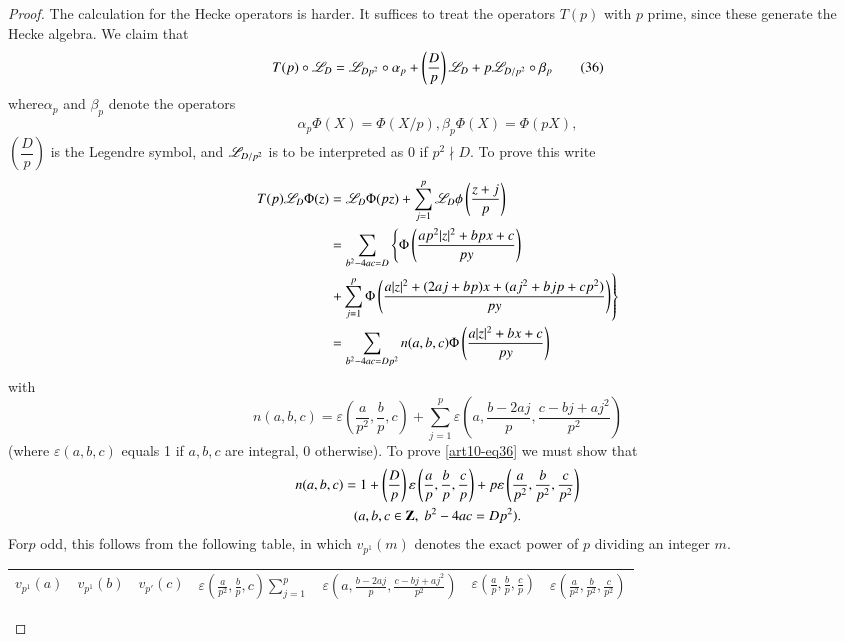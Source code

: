 \begin{proof}
The calculation for the Hecke operators is harder. It suffices to treat the operators $T(p)$ with $p$ prime, since these generate the Hecke algebra. We claim that 
\begin{equation*}
T (p) \circ \mathscr{L}_D =\mathscr{L}_{Dp^2} \circ  \alpha_p + \left(\frac{D}{p} \right) \mathscr{L}_D + p\mathscr{L}_{D/p^2} \circ \beta_p
\tag{36} \label{art10-eq36}
\end{equation*}
where\pageoriginale $\alpha_p$ and $\beta_p$ denote the operators
$$
\alpha_p \Phi (X) = \Phi (X/ p), \beta_p \Phi (X) = \Phi (pX),
$$
$\left(\dfrac{D}{p} \right)$ is the Legendre symbol, and $\mathscr{L}_{D/p^2}$ is to be interpreted as 0 if $p^2 \nmid D$.  To prove this write
\begin{align*}
T (p) \mathscr{L}_D \Phi (z) & = \mathscr{L}_D \Phi (pz) + \sum\limits^p_{j=1} \mathscr{L}_D \phi \left(\frac{z+j}{p} \right)\\
& = \sum\limits_{b^2 - 4 a c = D} \left\{\Phi \left(\frac{ap^2 |z|^2 + bpx + c}{py} \right) \right.\\
&\left.  + \sum\limits^p_{j=1} \Phi \left(\frac{a|z|^2 + (2aj + bp) x + (aj^2 + b jp + cp^2)}{py} \right) \right\}\\
& = \sum\limits_{b^2 - 4 a c = D p^2} n(a, b, c) \Phi \left(\frac{a|z|^2 + b x+ c}{py} \right)
\end{align*}
with 
$$
n (a, b, c) = \varepsilon \left(\frac{a}{p^2}, \frac{b}{p}, c \right) + \sum\limits^p_{j=1} \varepsilon \left(a, \frac{b - 2 aj}{p}, \frac{c-bj+ aj^2}{p^2} \right)
$$
(where $\varepsilon (a, b, c)$ equals 1 if $a, b, c$ are integral, 0 otherwise). To prove \eqref{art10-eq36} we must show that 
\begin{gather*}
n (a, b, c) = 1+ \left(\frac{D}{p} \right) \varepsilon \left(\frac{a}{p}, \frac{b}{p}, \frac{c}{p} \right) + p \varepsilon \left(\frac{a}{p^2}, \frac{b}{p^2}, \frac{c}{p^2} \right)\\
(a, b, c \in \mathbf{Z}, \; b^2 - 4 a c = Dp^2).
\end{gather*}
For\pageoriginale $p$ odd, this follows from the following table, in which $v_{p^1} (m)$ denotes the exact power of $p$ dividing an integer $m$.
\begin{center}
{\fontsize{9}{11}\selectfont
\renewcommand{\arraystretch}{1.2}
\tabcolsep=3pt
\begin{tabular}{ccc|cccc}
$v_{p^1} (a)$ & $v_{p^1}(b)$ & $v_{p'}(c)$ & $\varepsilon \left(\frac{a}{p^2}, \frac{b}{p}, c \right) \sum\limits^p_{j=1} $  & $\varepsilon \left(a, \frac{b - 2 a j}{p} , \frac{c - bj + aj^2}{p^2}\right)$  & $\varepsilon\left(\frac{a}{p}, \frac{b}{p}, \frac{c}{p} \right) $ & $\varepsilon \left(\frac{a}{p^2}, \frac{b}{p^2}, \frac{c}{p^2} \right)$\\\hline

\end{tabular}}
\end{center}
\end{proof}
